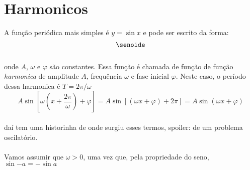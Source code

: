 \section{Harmonicos}
A função periódica mais simples é $y = \sin{x}$ e pode ser escrito da forma:
\begin{equation}
\label{harm}
    \senoide
\end{equation} 
\\
onde $A$, $\omega$ e $\varphi$ são constantes. Essa função é chamada de função 
de função \textit{harmonica} de amplitude $A$, frequência $\omega$ e fase
inicial $\varphi$. Neste caso, o período dessa harmonica é $T = 2\pi / \omega$
\begin{equation}
\label{harm_ex}
    A\sin{\left[\omega\left(x+\dfrac{2\pi}{\omega}\right) + \varphi\right]} = A\sin{[(\omega x + \varphi) + 2\pi]} = A\sin{(\omega x + \varphi)}
\end{equation}
\\
{{daí tem uma historinha de onde surgiu esses termos, spoiler: de um problema 
oscilatório.}}\\
\\
Vamos assumir que $\omega > 0$, uma vez que, pela propriedade do seno, $\sin{-a} = - \sin{a}$


